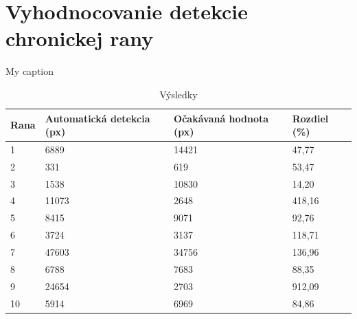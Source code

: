 \section{Vyhodnocovanie detekcie chronickej rany}
\begin{table}[h]
\centering
\caption{My caption}
\label{my-label}
\begin{tabular}{|l|l|l|l|}
\hline
Rana & Automatická detekcia (px) & Očakávaná hodnota (px) & Rozdiel (\%) \\ \hline
1    & 6889                      & 14421                             & 47,77         \\ \hline
2    & 331                       & 619                               & 53,47         \\ \hline
3    & 1538                      & 10830                             & 14,20        \\ \hline
4    & 11073                     & 2648                              & 418,16        \\ \hline
5    & 8415                      & 9071                              & 92,76        \\ \hline
6    & 3724                      & 3137                              & 118,71        \\ \hline
7    & 47603                     & 34756                             & 136,96         \\ \hline
8    & 6788                      & 7683                              & 88,35        \\ \hline
9    & 24654                     & 2703                              & 912,09        \\ \hline
10   & 5914                      & 6969                              & 84,86        \\ \hline
\end{tabular}
\caption{Výsledky}
\label{tab:result}
\end{table}

